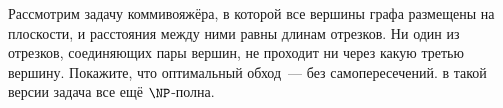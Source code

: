 Рассмотрим задачу коммивояжёра, в которой все вершины графа размещены на плоскости, и расстояния между
ними равны длинам отрезков. Ни один из отрезков, соединяющих пары вершин, не проходит ни через какую
третью вершину. Покажите, что оптимальный обход~--- без самопересечений.  в такой
версии задача все ещё $\NP$-полна.

